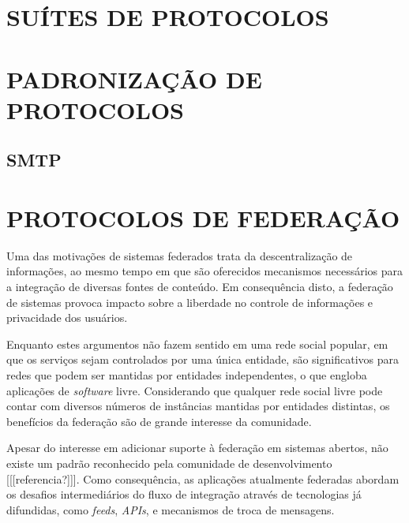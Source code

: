 \section{SUÍTES DE PROTOCOLOS}


\section{PADRONIZAÇÃO DE PROTOCOLOS}

\subsection{SMTP}



\section{PROTOCOLOS DE FEDERAÇÃO}


Uma das motivações de sistemas federados trata da descentralização de informações, ao
mesmo tempo em que são oferecidos mecanismos necessários para a integração de
diversas fontes de conteúdo. Em consequência disto, a federação de sistemas provoca
impacto sobre a liberdade no controle de informações e privacidade dos usuários.

Enquanto estes argumentos não fazem sentido em uma rede social popular, em que os
serviços sejam controlados por uma única entidade, são significativos para redes que
podem ser mantidas por entidades independentes, o que engloba aplicações de
\textit{software} livre. Considerando que qualquer rede social livre pode contar com
diversos números de instâncias mantidas por entidades distintas, os benefícios da
federação são de grande interesse da comunidade.

Apesar do interesse em adicionar suporte à federação em sistemas abertos, não existe
um padrão reconhecido pela comunidade de desenvolvimento [[[referencia?]]]. Como
consequência, as aplicações atualmente federadas abordam os desafios intermediários
do fluxo de integração através de tecnologias já difundidas, como \textit{feeds},
\textit{APIs}, e mecanismos de troca de mensagens.

